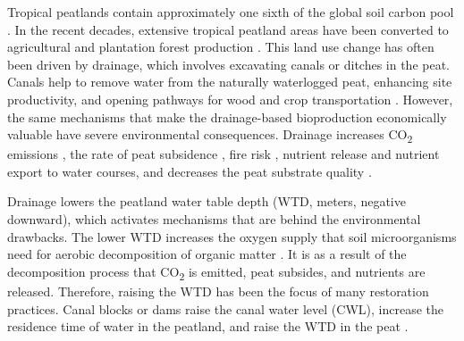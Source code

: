 \documentclass[bg, manuscript]{copernicus}
\begin{document}
Tropical peatlands contain approximately one sixth of the global soil carbon pool \citep{pageGlobalRegionalImportance2011, pageAnthropogenicImpactsLowland2022, xuPEATMAPRefiningEstimates2018}.
In the recent decades, extensive tropical peatland areas have been converted to agricultural and plantation forest production \citep{miettinenLandCoverDistribution2016, wijedasaCarbonEmissionsSouthEast2018}.
This land use change has often been driven by drainage, which involves excavating canals or ditches in the peat.
Canals help to remove water from the naturally waterlogged peat, enhancing site productivity, and  opening pathways for wood and crop transportation \citep{dohongReviewDriversTropical2017}.
However, the same mechanisms that make the drainage-based bioproduction economically valuable have severe environmental consequences.
Drainage increases CO\textsubscript{2} emissions \citep{novitaGeographicSettingGroundwater2021, jauhiainenCarbonDioxideEmissions2012, ishikuraSoilCarbonDioxide2018, carlsonModelingRelationshipsWater2015}, the rate of peat subsidence \citep{evansLongtermTrajectoryTemporal2022, evansRatesSpatialVariability2019, hooijerSubsidenceCarbonLoss2012, sinclairEffectsDistanceCanal2020, hoytWidespreadSubsidenceCarbon2020}, fire risk \citep{miettinenFireDistributionPeninsular2017, kielyAssessingCostsIndonesian2021}, nutrient release  \citep{laurenNutrientBalanceTool2021} and nutrient export to water courses, and decreases the peat substrate quality \citep{kononenDeforestedDrainedTropical2018}.

Drainage lowers the peatland water table depth (WTD, meters, negative downward), which activates mechanisms that are behind the environmental drawbacks.
The lower WTD increases the oxygen supply that soil microorganisms need for aerobic decomposition of organic matter \citep{pageAnthropogenicImpactsLowland2022}. 
It is as a result of the decomposition process that CO\textsubscript{2} is emitted, peat subsides, and nutrients are released.
Therefore, raising the WTD has been the focus of many restoration practices.
Canal blocks or dams raise the canal water level (CWL), increase the residence time of water in the peatland, and raise the WTD in the peat \citep{dohongReviewTechniquesEffective2018}.
\end{document}
